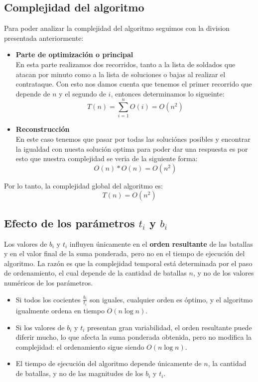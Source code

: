 \subsection{Complejidad del algoritmo}
Para poder analizar la complejidad del algoritmo seguimos con la division presentada anteriormente:
\begin{itemize}
    \item \textbf{Parte de optimización o principal}\\
    En esta parte realizamos dos recorridos, tanto a la lista de soldados que atacan por minuto como a la lista de soluciones o bajas al realizar el contrataque. Con esto nos damos cuenta que tenemos el primer recorrido que depende de $n$ y el segundo de $i$, entonces determinamos lo sigueinte:
        \[T(n) = \sum_{i=1}^{n} O(i) = O(n^2)\]
    
    \item \textbf{Reconstrucción}\\
    En este caso tenemos que pasar por todas las soluciónes posibles y encontrar la igualdad con nuesta solución optima para poder dar una respuesta es por esto que nuestra complejidad se veria de la siguiente forma:
        \[O(n) * O(n) = O(n^2)\]
\end{itemize}

Por lo tanto, la complejidad global del algoritmo es:\[T(n) = O(n^2)\]

\subsection{Efecto de los parámetros \(t_i\) y \(b_i\)}

Los valores de \(b_i\) y \(t_i\) influyen únicamente en el \textbf{orden resultante} de las batallas y en el valor final de la suma ponderada, pero no en el tiempo de ejecución del algoritmo. La razón es que la complejidad temporal está determinada por el paso de ordenamiento, el cual depende de la cantidad de batallas \(n\), y no de los valores numéricos de los parámetros.

\begin{itemize}
    \item Si todos los cocientes \( \tfrac{b_i}{t_i} \) son iguales, cualquier orden es óptimo, y el algoritmo igualmente ordena en tiempo \(O(n \log n)\).
    \item Si los valores de \(b_i\) y \(t_i\) presentan gran variabilidad, el orden resultante puede diferir mucho, lo que afecta la suma ponderada obtenida, pero no modifica la complejidad: el ordenamiento sigue siendo \(O(n \log n)\).
    \item El tiempo de ejecución del algoritmo depende únicamente de \(n\), la cantidad de batallas, y no de las magnitudes de los \(b_i\) y \(t_i\).
\end{itemize}